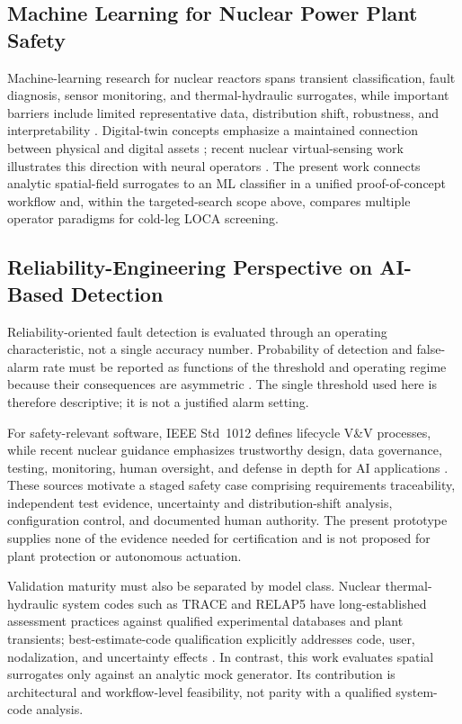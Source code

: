 \documentclass[journal]{IEEEtran}
\newcommand{\added}[1]{#1}
\begin{document}
\subsection{Machine Learning for Nuclear Power Plant Safety}
\added{Machine-learning research for nuclear reactors spans transient classification, fault diagnosis, sensor monitoring, and thermal-hydraulic surrogates, while important barriers include limited representative data, distribution shift, robustness, and interpretability \cite{huang2023review}. Digital-twin concepts emphasize a maintained connection between physical and digital assets \cite{grieves2014}; recent nuclear virtual-sensing work illustrates this direction with neural operators \cite{hossain2025virtual}. The present work connects analytic spatial-field surrogates to an ML classifier in a unified proof-of-concept workflow and, within the targeted-search scope above, compares multiple operator paradigms for cold-leg LOCA screening.}

\subsection{Reliability-Engineering Perspective on AI-Based Detection}
\label{sec:related_reliability}


\added{Reliability-oriented fault detection is evaluated through an operating characteristic, not a single accuracy number. Probability of detection and false-alarm rate must be reported as functions of the threshold and operating regime because their consequences are asymmetric \cite{isermann2005}. The single threshold used here is therefore descriptive; it is not a justified alarm setting.}

\added{For safety-relevant software, IEEE Std~1012 defines lifecycle V\&V processes, while recent nuclear guidance emphasizes trustworthy design, data governance, testing, monitoring, human oversight, and defense in depth for AI applications \cite{ieee1012,nrc7294,trilateral2024}. These sources motivate a staged safety case comprising requirements traceability, independent test evidence, uncertainty and distribution-shift analysis, configuration control, and documented human authority. The present prototype supplies none of the evidence needed for certification and is not proposed for plant protection or autonomous actuation.}

\added{Validation maturity must also be separated by model class. Nuclear thermal-hydraulic system codes such as TRACE and RELAP5 have long-established assessment practices against qualified experimental databases and plant transients; best-estimate-code qualification explicitly addresses code, user, nodalization, and uncertainty effects \cite{petruzzi2008,nrc_codes}. In contrast, this work evaluates spatial surrogates only against an analytic mock generator. Its contribution is architectural and workflow-level feasibility, not parity with a qualified system-code analysis.}
\end{document}
